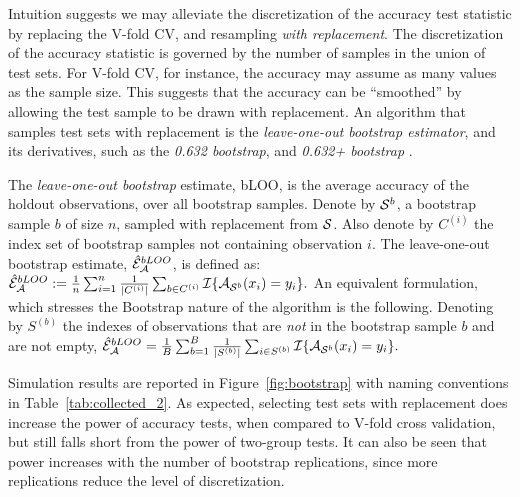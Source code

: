 \documentclass[onecolumn,draftclsnofoot]{IEEEtran}
\begin{document}
Intuition suggests we may alleviate the discretization of the accuracy test statistic by replacing the V-fold CV, and resampling \emph{with replacement}.
The discretization of the accuracy statistic is governed by the number of samples in the union of test sets.
For V-fold CV, for instance, the accuracy may assume as many values as the sample size. 
This suggests that the accuracy can be ``smoothed'' by allowing the test sample to be drawn with replacement. 
An algorithm that samples test sets with replacement is the \emph{leave-one-out bootstrap estimator},  and its derivatives, such as the \emph{0.632 bootstrap}, and \emph{0.632+ bootstrap} \cite[Sec 7.11]{hastie_elements_2003}.
\begin{definition}[bLOO]
	\label{def:bloo}
	The \emph{leave-one-out bootstrap} estimate, bLOO, is the average accuracy of the holdout observations, over all bootstrap samples. 
	Denote by $\mathcal{S}^b$, a bootstrap sample $b$ of size $n$, sampled with replacement from $\mathcal{S}$. 
	Also denote by $C^{(i)}$ the index set of bootstrap samples not containing observation $i$.
	The leave-one-out bootstrap estimate, $\hat{\mathcal{E}}_{\mathcal{A}}^{bLOO}$,  is defined as:
$\hat{\mathcal{E}}_{\mathcal{A}}^{bLOO}:= \frac 1n \sum_{i=1}^{n} \frac{1}{|C^{(i)}|} \sum_{b \in C^{(i)}} \mathcal{I}{\{ \mathcal{A}_{\mathcal{S}^b}(x_i)=y_i \}}.$
	An equivalent formulation, which stresses the Bootstrap nature of the algorithm is the following. 
	Denoting by $S^{(b)}$ the indexes of observations that are \emph{not} in the bootstrap sample $b$ and are not empty, 
$\hat{\mathcal{E}}_{\mathcal{A}}^{bLOO} = \frac 1B \sum_{b=1}^{B} \frac{1}{|S^{(b)}|} \sum_{i \in S^{(b)}} \mathcal{I}{\{ \mathcal{A}_{\mathcal{S}^b}(x_i)=y_i \}}.$
\end{definition}


Simulation results are reported in Figure~\ref{fig:bootstrap} with naming conventions in Table~\ref{tab:collected_2}.
As expected, selecting test sets with replacement does increase the power of accuracy tests, when compared to V-fold cross validation, but still falls short from the power of two-group tests. 
It can also be seen that power increases with the number of bootstrap replications, since more replications reduce the level of discretization.

\bigskip
\end{document}
